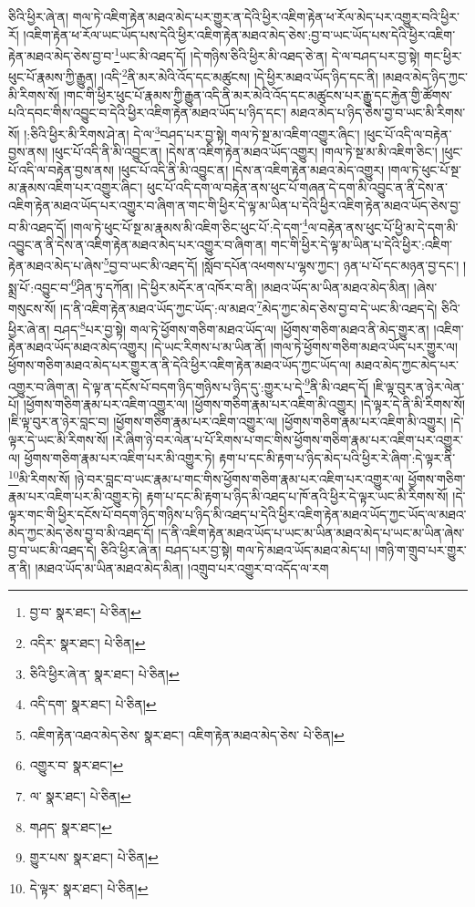 ཅིའི་ཕྱིར་ཞེ་ན། གལ་ཏེ་འཇིག་རྟེན་མཐའ་མེད་པར་གྱུར་ན་དེའི་ཕྱིར་འཇིག་རྟེན་ཕ་རོལ་མེད་པར་འགྱུར་བའི་ཕྱིར་རོ། །འཇིག་རྟེན་ཕ་རོལ་ཡང་ཡོད་པས་དེའི་ཕྱིར་འཇིག་རྟེན་མཐའ་མེད་ཅེས་:བྱ་བ་ཡང་ཡོད་པས་དེའི་ཕྱིར་འཇིག་རྟེན་མཐའ་མེད་ཅེས་བྱ་བ་\footnote{བྱ་བ་  སྣར་ཐང་།  པེ་ཅིན། }ཡང་མི་འཐད་དོ། །དེ་གཉིས་ཅིའི་ཕྱིར་མི་འཐད་ཅེ་ན། དེ་ལ་བཤད་པར་བྱ་སྟེ། གང་ཕྱིར་ཕུང་པོ་རྣམས་ཀྱི་རྒྱུན། །འདི་\footnote{འདིར་  སྣར་ཐང་།  པེ་ཅིན། }ནི་མར་མེའི་འོད་དང་མཚུངས། །དེ་ཕྱིར་མཐའ་ཡོད་ཉིད་དང་ནི། །མཐའ་མེད་ཉིད་ཀྱང་མི་རིགས་སོ། །གང་གི་ཕྱིར་ཕུང་པོ་རྣམས་ཀྱི་རྒྱུན་འདི་ནི་མར་མེའི་འོད་དང་མཚུངས་པར་རྒྱུ་དང་རྐྱེན་གྱི་ཚོགས་པའི་དབང་གིས་འབྱུང་བ་དེའི་ཕྱིར་འཇིག་རྟེན་མཐའ་ཡོད་པ་ཉིད་དང་། མཐའ་མེད་པ་ཉིད་ཅེས་བྱ་བ་ཡང་མི་རིགས་སོ། །:ཅིའི་ཕྱིར་མི་རིགས་ཤེ་ན། དེ་ལ་\footnote{ཅིའི་ཕྱིར་ཞེ་ན་  སྣར་ཐང་།  པེ་ཅིན། }བཤད་པར་བྱ་སྟེ། གལ་ཏེ་སྔ་མ་འཇིག་འགྱུར་ཞིང་། །ཕུང་པོ་འདི་ལ་བརྟེན་བྱས་ནས། །ཕུང་པོ་འདི་ནི་མི་འབྱུང་ན། །དེས་ན་འཇིག་རྟེན་མཐའ་ཡོད་འགྱུར། །གལ་ཏེ་སྔ་མ་མི་འཇིག་ཅིང་། །ཕུང་པོ་འདི་ལ་བརྟེན་བྱས་ནས། །ཕུང་པོ་འདི་ནི་མི་འབྱུང་ན། །དེས་ན་འཇིག་རྟེན་མཐའ་མེད་འགྱུར། །གལ་ཏེ་ཕུང་པོ་སྔ་མ་རྣམས་འཇིག་པར་འགྱུར་ཞིང་། ཕུང་པོ་འདི་དག་ལ་བརྟེན་ནས་ཕུང་པོ་གཞན་དེ་དག་མི་འབྱུང་ན་ནི་དེས་ན་འཇིག་རྟེན་མཐའ་ཡོད་པར་འགྱུར་བ་ཞིག་ན་གང་གི་ཕྱིར་དེ་ལྟ་མ་ཡིན་པ་དེའི་ཕྱིར་འཇིག་རྟེན་མཐའ་ཡོད་ཅེས་བྱ་བ་མི་འཐད་དོ། །གལ་ཏེ་ཕུང་པོ་སྔ་མ་རྣམས་མི་འཇིག་ཅིང་ཕུང་པོ་:དེ་དག་\footnote{འདི་དག་  སྣར་ཐང་།  པེ་ཅིན། }ལ་བརྟེན་ནས་ཕུང་པོ་ཕྱི་མ་དེ་དག་མི་འབྱུང་ན་ནི་དེས་ན་འཇིག་རྟེན་མཐའ་མེད་པར་འགྱུར་བ་ཞིག་ན། གང་གི་ཕྱིར་དེ་ལྟ་མ་ཡིན་པ་དེའི་ཕྱིར་:འཇིག་རྟེན་མཐའ་མེད་པ་ཞེས་\footnote{འཇིག་རྟེན་འཐའ་མེད་ཅེས་  སྣར་ཐང་། འཇིག་རྟེན་མཐའ་མེད་ཅེས་  པེ་ཅིན། }བྱ་བ་ཡང་མི་འཐད་དོ། །སློབ་དཔོན་འཕགས་པ་ལྷས་ཀྱང་། ཉན་པ་པོ་དང་མཉན་བྱ་དང་། །སྨྲ་པོ་:འབྱུང་བ་\footnote{འགྱུར་བ་  སྣར་ཐང་། }ཤིན་ཏུ་དཀོན། །དེ་ཕྱིར་མདོར་ན་འཁོར་བ་ནི། །མཐའ་ཡོད་མ་ཡིན་མཐའ་མེད་མིན། །ཞེས་གསུངས་སོ། །ད་ནི་འཇིག་རྟེན་མཐའ་ཡོད་ཀྱང་ཡོད་:ལ་མཐའ་\footnote{ལ་  སྣར་ཐང་།  པེ་ཅིན། }མེད་ཀྱང་མེད་ཅེས་བྱ་བ་དེ་ཡང་མི་འཐད་དེ། ཅིའི་ཕྱིར་ཞེ་ན། བཤད་\footnote{གཤད་  སྣར་ཐང་། }པར་བྱ་སྟེ། གལ་ཏེ་ཕྱོགས་གཅིག་མཐའ་ཡོད་ལ། །ཕྱོགས་གཅིག་མཐའ་ནི་མེད་གྱུར་ན། །འཇིག་རྟེན་མཐའ་ཡོད་མཐའ་མེད་འགྱུར། །དེ་ཡང་རིགས་པ་མ་ཡིན་ནོ། །གལ་ཏེ་ཕྱོགས་གཅིག་མཐའ་ཡོད་པར་གྱུར་ལ། ཕྱོགས་གཅིག་མཐའ་མེད་པར་གྱུར་ན་ནི་དེའི་ཕྱིར་འཇིག་རྟེན་མཐའ་ཡོད་ཀྱང་ཡོད་ལ། མཐའ་མེད་ཀྱང་མེད་པར་འགྱུར་བ་ཞིག་ན། དེ་ལྟ་ན་དངོས་པོ་བདག་ཉིད་གཉིས་པ་ཉིད་དུ་:གྱུར་པ་དེ་\footnote{གྱུར་པས་  སྣར་ཐང་།  པེ་ཅིན། }ནི་མི་འཐད་དོ། །ཇི་ལྟ་བུར་ན་ཉེར་ལེན་པོ། །ཕྱོགས་གཅིག་རྣམ་པར་འཇིག་འགྱུར་ལ། །ཕྱོགས་གཅིག་རྣམ་པར་འཇིག་མི་འགྱུར། །དེ་ལྟར་དེ་ནི་མི་རིགས་སོ། །ཇི་ལྟ་བུར་ན་ཉེར་བླང་བ། །ཕྱོགས་གཅིག་རྣམ་པར་འཇིག་འགྱུར་ལ། །ཕྱོགས་གཅིག་རྣམ་པར་འཇིག་མི་འགྱུར། །དེ་ལྟར་དེ་ཡང་མི་རིགས་སོ། །རེ་ཞིག་ཉེ་བར་ལེན་པ་པོ་རིགས་པ་གང་གིས་ཕྱོགས་གཅིག་རྣམ་པར་འཇིག་པར་འགྱུར་ལ། ཕྱོགས་གཅིག་རྣམ་པར་འཇིག་པར་མི་འགྱུར་ཏེ། རྟག་པ་དང་མི་རྟག་པ་ཉིད་མེད་པའི་ཕྱིར་རེ་ཞིག་:དེ་ལྟར་ནི་\footnote{དེ་ལྟར་  སྣར་ཐང་།  པེ་ཅིན། }མི་རིགས་སོ། །ཉེ་བར་བླང་བ་ཡང་རྣམ་པ་གང་གིས་ཕྱོགས་གཅིག་རྣམ་པར་འཇིག་པར་འགྱུར་ལ། ཕྱོགས་གཅིག་རྣམ་པར་འཇིག་པར་མི་འགྱུར་ཏེ། རྟག་པ་དང་མི་རྟག་པ་ཉིད་མི་འཐད་པ་ཁོ་ནའི་ཕྱིར་དེ་ལྟར་ཡང་མི་རིགས་སོ། །དེ་ལྟར་གང་གི་ཕྱིར་དངོས་པོ་བདག་ཉིད་གཉིས་པ་ཉིད་མི་འཐད་པ་དེའི་ཕྱིར་འཇིག་རྟེན་མཐའ་ཡོད་ཀྱང་ཡོད་ལ་མཐའ་མེད་ཀྱང་མེད་ཅེས་བྱ་བ་མི་འཐད་དོ། །ད་ནི་འཇིག་རྟེན་མཐའ་ཡོད་པ་ཡང་མ་ཡིན་མཐའ་མེད་པ་ཡང་མ་ཡིན་ཞེས་བྱ་བ་ཡང་མི་འཐད་དེ། ཅིའི་ཕྱིར་ཞེ་ན། བཤད་པར་བྱ་སྟེ། གལ་ཏེ་མཐའ་ཡོད་མཐའ་མེད་པ། །གཉི་ག་གྲུབ་པར་གྱུར་ན་ནི། །མཐའ་ཡོད་མ་ཡིན་མཐའ་མེད་མིན། །འགྲུབ་པར་འགྱུར་བ་འདོད་ལ་རག 